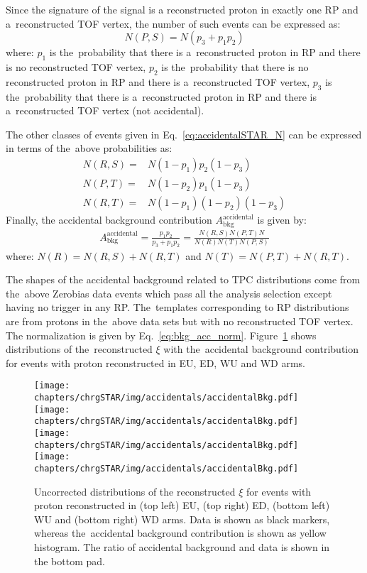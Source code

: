 Since the signature of the signal is a reconstructed proton in exactly one RP and a~reconstructed TOF vertex, the number of such events can be expressed as:
\begin{equation}
N(P,S)=N\left(p_3+p_1p_2\right)
\end{equation}
where: $p_1$ is the~probability that there is a~reconstructed proton in RP and there is no reconstructed TOF vertex, $p_2$ is the~probability that there is no reconstructed proton in RP and  there is a~reconstructed TOF vertex, $p_3$ is the~probability that there is a~reconstructed proton in RP and  there is a~reconstructed TOF vertex (not accidental).

The other classes of events given in Eq.~\eqref{eq:accidentalSTAR_N} can be expressed in terms of the~above probabilities as:
\begin{equation}
\begin{split}
N(R,S)=  & N(1-p_1)p_2(1-p_3)\\
N(P,T) = & N(1-p_2)p_1(1-p_3)\\
N(R,T) = & N(1-p_1)(1-p_2)(1-p_3)
\end{split}
\end{equation}
Finally, the accidental background contribution $A_{\mathrm{bkg} }^{\mathrm{accidental}}$ is  given by:
\begin{equation}
\begin{split}
A_{\mathrm{bkg}}^{\mathrm{accidental}}=  \frac{p_1p_2}{p_3+p_1p_2}=\frac{N(R,S)N(P,T)N}{N(R)N(T)N(P,S)}
\end{split}
\label{eq:bkg_acc_norm}
\end{equation} 
where: $N(R)=N(R,S)+N(R,T)$ and $N(T)=N(P,T)+N(R,T)$.

The shapes of the accidental background related to TPC distributions come from the~above Zerobias data events which pass all the analysis selection except having no trigger in any RP. The~templates corresponding to RP distributions are from protons in the~above data sets but with no reconstructed TOF vertex. The normalization is given by Eq.~\eqref{eq:bkg_acc_norm}. Figure~\ref{fig:STARaccidentalsXi} shows distributions of the~reconstructed $\xi$ with the~accidental background contribution  for events with proton reconstructed in EU, ED, WU and WD arms. 

\begin{figure}[h!]
	\centering
	\texttt{[image: chapters/chrgSTAR/img/accidentals/accidentalBkg.pdf]}
	\texttt{[image: chapters/chrgSTAR/img/accidentals/accidentalBkg.pdf]}
	\texttt{[image: chapters/chrgSTAR/img/accidentals/accidentalBkg.pdf]}
	\texttt{[image: chapters/chrgSTAR/img/accidentals/accidentalBkg.pdf]}
	\caption{Uncorrected distributions of the reconstructed $\xi$ for events with proton reconstructed in  (top left) EU, (top right) ED, (bottom left) WU and (bottom right) WD arms. Data is shown as black markers, whereas the~accidental background contribution is shown as yellow histogram.  The ratio of accidental background and data is shown in the bottom pad.}
	\label{fig:STARaccidentalsXi}
\end{figure}

